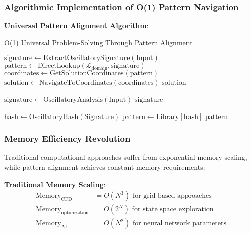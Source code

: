 \documentclass[11pt,a4paper]{article}
\theoremstyle{remark}
\begin{document}
\subsubsection{Algorithmic Implementation of O(1) Pattern Navigation}

\textbf{Universal Pattern Alignment Algorithm}:

\begin{algorithm}
\caption{O(1) Universal Problem-Solving Through Pattern Alignment}
\begin{algorithmic}[1]
    \State $\text{signature} \leftarrow \text{ExtractOscillatorySignature}(\text{Input})$
    \State $\text{pattern} \leftarrow \text{DirectLookup}(\mathcal{L}_{\text{domain}}, \text{signature})$ 
    \State $\text{coordinates} \leftarrow \text{GetSolutionCoordinates}(\text{pattern})$ 
    \State $\text{solution} \leftarrow \text{NavigateToCoordinates}(\text{coordinates})$ 
    \Return $\text{solution}$
\EndProcedure

    \State $\text{signature} \leftarrow \text{OscillatoryAnalysis}(\text{Input})$ 
    \Return $\text{signature}$
\EndProcedure

    \State $\text{hash} \leftarrow \text{OscillatoryHash}(\text{Signature})$ 
    \State $\text{pattern} \leftarrow \text{Library}[\text{hash}]$ 
    \Return $\text{pattern}$
\EndProcedure
\end{algorithmic}
\end{algorithm}

\subsubsection{Memory Efficiency Revolution}

Traditional computational approaches suffer from exponential memory scaling, while pattern alignment achieves constant memory requirements:

\textbf{Traditional Memory Scaling}:
\begin{align}
\text{Memory}_{\text{CFD}} &= O(N^3) \text{ for grid-based approaches} \\
\text{Memory}_{\text{optimization}} &= O(2^N) \text{ for state space exploration} \\
\text{Memory}_{\text{AI}} &= O(N^2) \text{ for neural network parameters}
\end{align}
\end{document}
